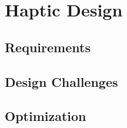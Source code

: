 \chapter{Haptic Design}
\section{Requirements}

\section{Design Challenges}

\section{Optimization}	